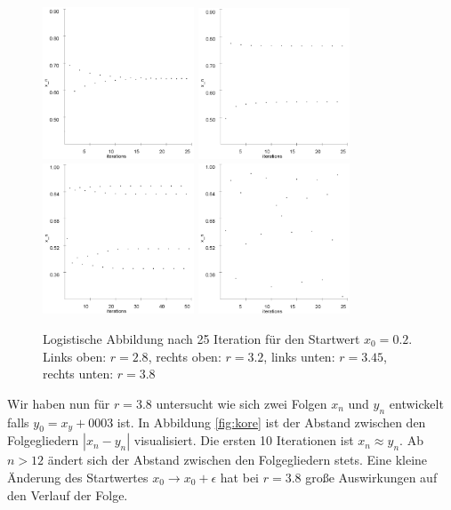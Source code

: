 \documentclass[12pt,a4paper]{article}
\begin{document}
\begin{figure}[!htbp]
	\centering
	\includegraphics[width=170px]{logi/xn28}
	\includegraphics[width=170px]{logi/xn32}
	\includegraphics[width=170px]{logi/xn345}
	\includegraphics[width=170px]{logi/xn38}
	\caption{Logistische Abbildung nach 25 Iteration für den Startwert $x_0=0.2$. Links oben: $r=2.8$, rechts oben: $r=3.2$, links unten: $r=3.45$, rechts unten: $r=3.8$}
	\label{fig:logi-disk}
\end{figure}
\newline
Wir haben nun für $r=3.8$ untersucht wie sich zwei Folgen $x_n$ und $y_n$ entwickelt falls $y_0=x_y+0003$ ist. In Abbildung \ref{fig:kore} ist der Abstand zwischen den Folgegliedern $|x_n-y_n|$ visualisiert. Die ersten 10 Iterationen ist $x_n \approx y_n$. Ab $n>12$ ändert sich der Abstand zwischen den Folgegliedern stets. Eine kleine Änderung des Startwertes $x_0 \rightarrow x_0 + \epsilon$ hat bei $r=3.8$ große Auswirkungen auf den Verlauf der Folge.
\end{document}
